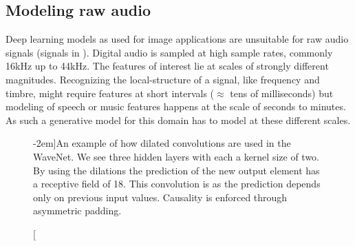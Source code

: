 \subsection{Modeling raw audio}%
\label{sec:raw_audio}
Deep learning models as used for image applications are unsuitable for raw audio signals (signals in ). Digital audio is sampled at high sample rates, commonly 16kHz up to 44kHz. The features of interest lie at scales of strongly different magnitudes. Recognizing the local-structure of a signal, like frequency and timbre, might require features at short intervals (\(\approx\) tens of milliseconds) but modeling of speech or music features happens at the scale of seconds to minutes. As such a generative model for this domain has to model at these different scales.

\begin{figure}
    
    \caption[][-2em]{An example of how dilated convolutions are used in the WaveNet. We see three hidden layers with each a kernel size of two. By using the dilations the prediction of the new output element has a receptive field of 18. This convolution is  as the prediction depends only on previous input values. Causality is enforced through asymmetric padding.}%
    \label{fig:wavenet}
\end{figure}

